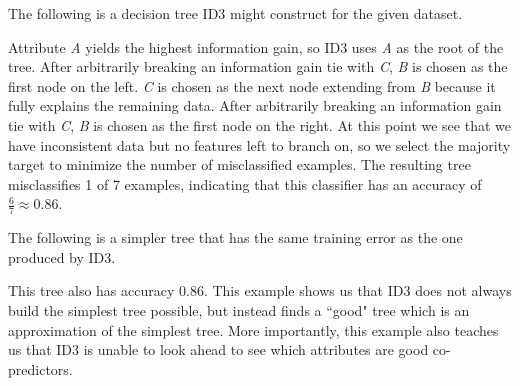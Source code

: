 \documentclass[solution, letterpaper]{cs121}
\begin{document}
\subproblem The following is a decision tree ID3 might construct for the given dataset.

\begin{center}
\end{center}

Attribute \emph{A} yields the highest information gain, so ID3 uses \emph{A} as the root of the tree. After arbitrarily breaking an information gain tie with \emph{C}, \emph{B} is chosen as the first node on the left. \emph{C} is chosen as the next node extending from \emph{B} because it fully explains the remaining data. After arbitrarily breaking an information gain tie with \emph{C}, \emph{B} is chosen as the first node on the right. At this point we see that we have inconsistent data but no features left to branch on, so we select the majority target to minimize the number of misclassified examples. The resulting tree misclassifies 1 of 7 examples, indicating that this classifier has an accuracy of $\frac{6}{7} \approx 0.86$.


\subproblem The following is a simpler tree that has the same training error as the one produced by ID3.

\begin{center}
\end{center}

This tree also has accuracy 0.86. This example shows us that ID3 does not always build the simplest tree possible, but instead finds a ``good" tree which is an approximation of the simplest tree. More importantly, this example also teaches us that ID3 is unable to look ahead to see which attributes are good co-predictors. 
\end{document}
